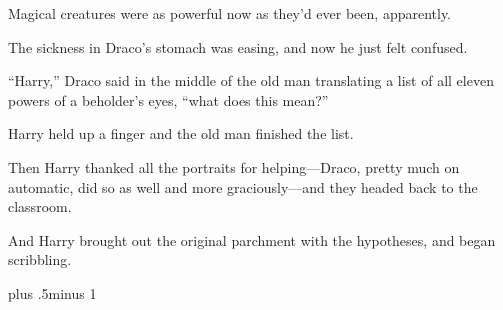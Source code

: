 Magical creatures were as powerful now as they’d ever been, apparently.

The sickness in Draco’s stomach was easing, and now he just felt confused.

“Harry,” Draco said in the middle of the old man translating a list of all
eleven powers of a beholder’s eyes, “what does this mean?”

Harry held up a finger and the old man finished the list.

Then Harry thanked all the portraits for helping—Draco, pretty much on
automatic, did so as well and more graciously—and they headed back to the
classroom.

And Harry brought out the original parchment with the hypotheses, and began
scribbling.

\baselineskip plus .5\textheight minus 1\baselineskip

\savetrivseps
\setlength{\topsep}{0pt}
\setlength{\partopsep}{0pt}

